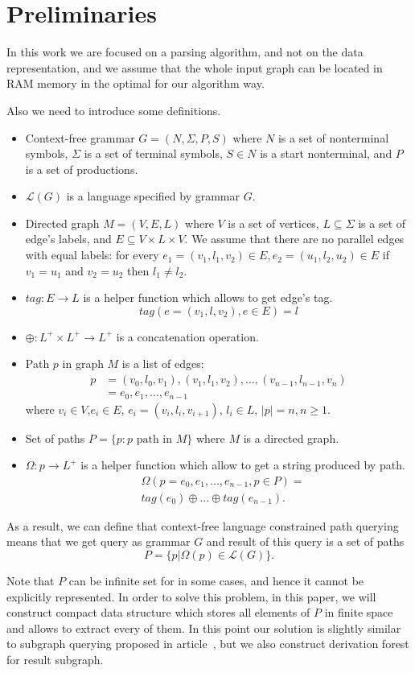 \section{Preliminaries}

In this work we are focused on a parsing algorithm, and not on the data representation, and we assume that the whole input graph can be located in RAM memory in the optimal for our algorithm way.

Also we need to introduce some definitions.
\begin{itemize}
  \item Context-free grammar $G=(N, \Sigma, P, S)$ where $N$ is a set of nonterminal symbols, $\Sigma$ is a set of terminal symbols, $S \in N$ is a start nonterminal, and $P$ is a set of productions. 
  \item $\mathcal{L}(G)$ is a language specified by grammar $G$.
  \item Directed graph $M = (V,E,L)$ where $V$ is a set of vertices, $L \subseteq \Sigma$ is a set of edge's labels, and $E\subseteq V\times L\times V$. 
  We assume that there are no parallel edges with equal labels: for every $e_1=(v_1,l_1,v_2) \in E, e_2=(u_1,l_2,u_2) \in E$ if $v_1 = u_1$ and $v_2 = u_2$ then $l_1 \neq l_2$.
  \item $tag: E \rightarrow L$ is a helper function which allows to get edge's tag. $$tag(e = (v_1,l,v_2), e \in E) = l$$
  \item $\oplus: L^+ \times L^+ \rightarrow L^+$ is a concatenation operation.
  \item Path $p$ in graph $M$ is a list of edges: 
  \begin{align*}
   p &= (v_0,l_0,v_1),(v_1,l_1,v_2),\dots,(v_{n-1},l_{n-1},v_n) \\
     &= e_0,e_1,\dots,e_{n-1}
  \end{align*}
  where $v_i \in V$,$e_i \in E$, $e_i=(v_i,l_i,v_{i+1})$, $l_i \in L$, $|p| = n, n \geq 1$. 
  \item Set of paths $P = \{p: p \text{ path in } M\}$ where $M$ is a directed graph.
  \item $\Omega: p \rightarrow L^+$ is a helper function which allow to get a string produced by path. 
  \begin{align*}
  & \Omega(p = e_{0},e_{1},\dots,e_{n-1}, p \in P) = \\
  & tag (e_{0}) \oplus \dots \oplus tag (e_{n-1}).
  \end{align*}
\end{itemize}

As a result, we can define that context-free language constrained path querying means that we get query as grammar $G$ and result of this query is a set of paths $$P=\{p|\Omega(p) \in \mathcal{L}(G)\}.$$

Note that $P$ can be infinite set for in some cases, and hence it cannot be explicitly represented. 
In order to solve this problem, in this paper, we will construct compact data structure which stores all elements of $P$ in finite space and allows to extract every of them.
In this point our solution is slightly similar to subgraph querying proposed in article~\cite{GraphQueryWithEarley}, but we also construct derivation forest for result subgraph.
